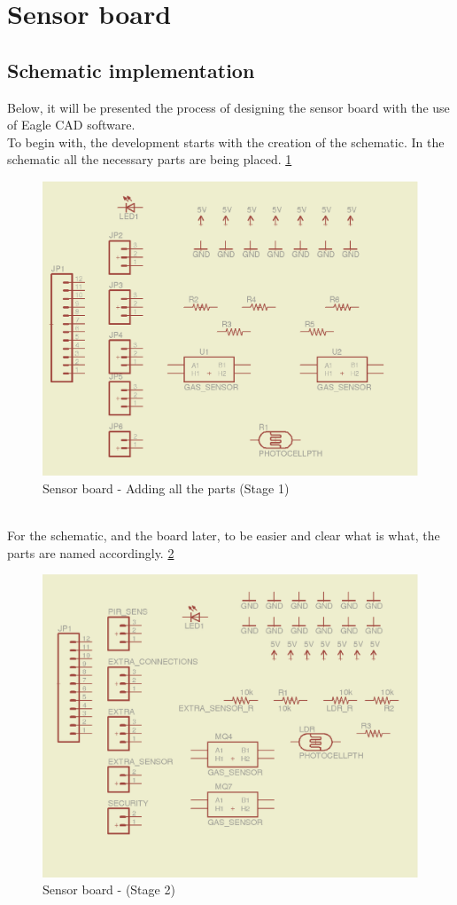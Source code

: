 \documentclass[12pt,a4paper]{report}
\begin{document}
\section{Sensor board}
\subsection{Schematic implementation}
Below, it will be presented the process of designing the sensor board with the use of Eagle CAD software.
\ \\
To begin with, the development starts with the creation of the schematic. In the schematic all the necessary parts are being placed. \ref{Sensor-brd-s1}
\ \\
\begin{figure}[H]
\centering
\includegraphics*[scale=0.25]{sens_brd_s1}
\caption{Sensor board - Adding all the parts (Stage 1)}
\label{Sensor-brd-s1}
\end{figure}
\ \\
For the schematic, and the board later, to be easier and clear what is what, the parts are named accordingly. \ref{Sensor-brd-s2}
\begin{figure}[H]
\centering
\includegraphics*[scale=0.25]{sens_brd_s2}
\caption{Sensor board -  (Stage 2)}
\label{Sensor-brd-s2}
\end{figure}
\end{document}
